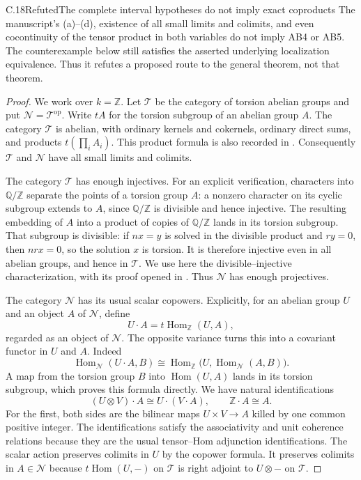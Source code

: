 \begin{claim}{C.18}{Refuted}{The complete interval hypotheses do not imply exact coproducts}\label{C18}
The manuscript's (a)--(d), existence of all small limits and colimits, and even cocontinuity of the tensor product in both variables do not imply AB4 or AB5. The counterexample below still satisfies the asserted underlying localization equivalence. Thus it refutes a proposed route to the general theorem, not that theorem.
\end{claim}
\begin{proof}
We work over $k=\mathbb Z$. Let $\mathcal T$ be the category of torsion abelian groups and put $\mathcal N=\mathcal T^{\mathrm{op}}$. Write $tA$ for the torsion subgroup of an abelian group $A$. The category $\mathcal T$ is abelian, with ordinary kernels and cokernels, ordinary direct sums, and products $t(\prod_iA_i)$. This product formula is also recorded in \citet[Introduction]{Rickard2020C}. Consequently $\mathcal T$ and $\mathcal N$ have all small limits and colimits.

The category $\mathcal T$ has enough injectives. For an explicit verification, characters into $\mathbb Q/\mathbb Z$ separate the points of a torsion group $A$: a nonzero character on its cyclic subgroup extends to $A$, since $\mathbb Q/\mathbb Z$ is divisible and hence injective. The resulting embedding of $A$ into a product of copies of $\mathbb Q/\mathbb Z$ lands in its torsion subgroup. That subgroup is divisible: if $nx=y$ is solved in the divisible product and $ry=0$, then $nrx=0$, so the solution $x$ is torsion. It is therefore injective even in all abelian groups, and hence in $\mathcal T$. We use here the divisible--injective characterization, with its proof opened in \citet[Lemma 15.55.1, tag 01D6]{StacksInjectiveAbC}. Thus $\mathcal N$ has enough projectives.

The category $\mathcal N$ has its usual scalar copowers. Explicitly, for an abelian group $U$ and an object $A$ of $\mathcal N$, define
\[
 U\cdot A=t\operatorname{Hom}_{\mathbb Z}(U,A),
\]
regarded as an object of $\mathcal N$. The opposite variance turns this into a covariant functor in $U$ and $A$. Indeed
\[
 \operatorname{Hom}_{\mathcal N}(U\cdot A,B)
 \cong\operatorname{Hom}_{\mathbb Z}
       \bigl(U,\operatorname{Hom}_{\mathcal N}(A,B)\bigr).
\]
A map from the torsion group $B$ into $\operatorname{Hom}(U,A)$ lands in its torsion subgroup, which proves this formula directly. We have natural identifications
\[
 (U\otimes V)\cdot A\cong U\cdot(V\cdot A),
 \qquad\mathbb Z\cdot A\cong A.
\]
For the first, both sides are the bilinear maps $U\times V\to A$ killed by one common positive integer. The identifications satisfy the associativity and unit coherence relations because they are the usual tensor--Hom adjunction identifications. The scalar action preserves colimits in $U$ by the copower formula. It preserves colimits in $A\in\mathcal N$ because $t\operatorname{Hom}(U,-)$ on $\mathcal T$ is right adjoint to $U\otimes -$ on $\mathcal T$.


\end{proof}
